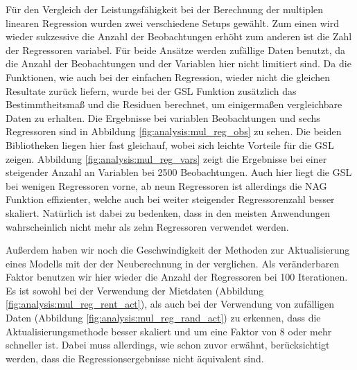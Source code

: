 Für den Vergleich der Leistungsfähigkeit bei der Berechnung der multiplen linearen Regression wurden zwei verschiedene Setups gewählt.
Zum einen wird wieder sukzessive die Anzahl der Beobachtungen erhöht zum anderen ist die Zahl der Regressoren variabel. 
Für beide Ansätze werden zufällige Daten benutzt, da die Anzahl der Beobachtungen und der Variablen hier nicht limitiert sind.
Da die Funktionen, wie auch bei der einfachen Regression, wieder nicht die gleichen Resultate zurück liefern, wurde bei der GSL Funktion zusätzlich das Bestimmtheitsmaß und die Residuen berechnet, um einigermaßen vergleichbare Daten zu erhalten.
Die Ergebnisse bei variablen Beobachtungen und sechs Regressoren sind in Abbildung \ref{fig:analysis:mul_reg_obs} zu sehen.
Die beiden Bibliotheken liegen hier fast gleichauf, wobei sich leichte Vorteile für die GSL zeigen.
Abbildung \ref{fig:analysis:mul_reg_vars} zeigt die Ergebnisse bei einer steigender Anzahl an Variablen bei 2500 Beobachtungen.
Auch hier liegt die GSL bei wenigen Regressoren vorne, ab neun Regressoren ist allerdings die NAG Funktion effizienter, welche auch bei weiter steigender Regressorenzahl besser skaliert.
Natürlich ist dabei zu bedenken, dass in den meisten Anwendungen wahrscheinlich nicht mehr als zehn Regressoren verwendet werden.

Außerdem haben wir noch die Geschwindigkeit der Methoden zur Aktualisierung eines Modells mit der der Neuberechnung in der \naglib verglichen.
Als veränderbaren Faktor benutzen wir hier wieder die Anzahl der Regressoren bei 100 Iterationen.
Es ist sowohl bei der Verwendung der Mietdaten (Abbildung \ref{fig:analysis:mul_reg_rent_act}), als auch bei der Verwendung von zufälligen Daten (Abbildung \ref{fig:analysis:mul_reg_rand_act}) zu erkennen, dass die Aktualisierungsmethode besser skaliert und um eine Faktor von 8 oder mehr schneller ist.
Dabei muss allerdings, wie schon zuvor erwähnt, berücksichtigt werden, dass die Regressionsergebnisse nicht äquivalent sind.


